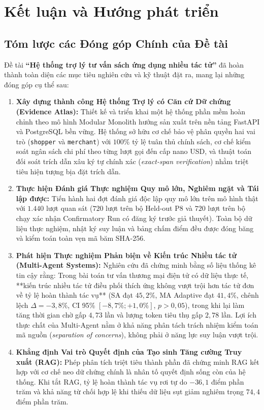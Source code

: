 \section{Kết luận và Hướng phát triển}

\subsection{Tóm lược các Đóng góp Chính của Đề tài}
Đề tài \textbf{``Hệ thống trợ lý tư vấn sách ứng dụng nhiều tác tử''} đã hoàn thành toàn diện các mục tiêu nghiên cứu và kỹ thuật đặt ra, mang lại những đóng góp cụ thể sau:

\begin{enumerate}
    \item \textbf{Xây dựng thành công Hệ thống Trợ lý có Căn cứ Dữ chứng (Evidence Atlas):} Thiết kế và triển khai một hệ thống phần mềm hoàn chỉnh theo mô hình Modular Monolith hướng sản xuất trên nền tảng FastAPI và PostgreSQL bền vững. Hệ thống sở hữu cơ chế bảo vệ phân quyền hai vai trò (\texttt{shopper} và \texttt{merchant}) với $100\%$ tỷ lệ tuân thủ chính sách, cơ chế kiểm soát ngân sách chi phí theo từng lượt gọi đến cấp nano USD, và thuật toán đối soát trích dẫn xâu ký tự chính xác (\textit{exact-span verification}) nhằm triệt tiêu hiện tượng bịa đặt trích dẫn.
    \item \textbf{Thực hiện Đánh giá Thực nghiệm Quy mô lớn, Nghiêm ngặt và Tái lập được:} Tiến hành hai đợt đánh giá độc lập quy mô lớn trên mô hình thật với $1.440$ lượt quan sát ($720$ lượt trên bộ Held-out P8 và $720$ lượt trên bộ chạy xác nhận Confirmatory Run có đăng ký trước giả thuyết). Toàn bộ dữ liệu thực nghiệm, nhật ký suy luận và bảng chấm điểm đều được đóng băng và kiểm toán toàn vẹn mã băm SHA-256.
    \item \textbf{Phát hiện Thực nghiệm Phản biện về Kiến trúc Nhiều tác tử (Multi-Agent Systems):} Nghiên cứu đã chứng minh bằng số liệu thống kê tin cậy rằng: Trong bài toán tư vấn thương mại điện tử có dữ liệu thực tế, **kiến trúc nhiều tác tử điều phối thích ứng không vượt trội hơn tác tử đơn về tỷ lệ hoàn thành tác vụ** (SA đạt $45{,}2\%$, MA Adaptive đạt $41{,}4\%$, chênh lệch $\Delta = -3{,}8\%$, CI 95\% $[-8{,}7\%; +1{,}0\%]$, $p > 0{,}05$), trong khi lại làm tăng thời gian chờ gấp $4{,}73$ lần và lượng token tiêu thụ gấp $2{,}78$ lần. Lợi ích thực chất của Multi-Agent nằm ở khả năng phân tách trách nhiệm kiểm toán mã nguồn (\textit{separation of concerns}), không phải ở năng lực suy luận vượt trội.
    \item \textbf{Khẳng định Vai trò Quyết định của Tạo sinh Tăng cường Truy xuất (RAG):} Phép phân tích triệt tiêu thành phần đã chứng minh RAG kết hợp với cơ chế neo dữ chứng chính là nhân tố quyết định sống còn của hệ thống. Khi tắt RAG, tỷ lệ hoàn thành tác vụ rơi tự do $-36{,}1$ điểm phần trăm và khả năng từ chối hợp lệ khi thiếu dữ liệu sụt giảm nghiêm trọng $74{,}4$ điểm phần trăm.

\end{enumerate}
